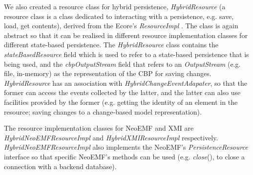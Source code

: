 \documentclass{llncs}
\begin{document}
We also created a resource class for hybrid persistence, \textit{HybridResource} (a resource class is a class dedicated to interacting with a persistence, e.g. save, load, get contents), derived from the Ecore's \textit{ResourceImpl}%
. The class is again abstract so that it can be realised in different resource implementation classes for different state-based persistence. The \textit{HybridResource} class contains the \textit{stateBasedResource} field which is used to refer to a state-based persistence that is being used, and the \textit{cbpOutputStream} field that refers to an \textit{OutputStream} (e.g. file, in-memory) as the representation of the CBP for saving changes. \textit{HybridResource} has an association with \textit{HybridChangeEventAdapater}, so that the former can access the events collected by the latter, and the latter can also use facilities provided by the former (e.g. getting the identity of an element in the resource; saving changes to a change-based model representation).

The resource implementation classes for NeoEMF and XMI are \textit{HybridNeoEMFResourceImpl} and \textit{HybridXMIResourceImpl} respectively. \textit{HybridNeoEMFResourceImpl} also implements the NeoEMF's \textit{PersistenceResource} interface %
so that specific NeoEMF's methods can be used (e.g. \textit{close}(), to close a connection with a backend database).


%
%
\end{document}

